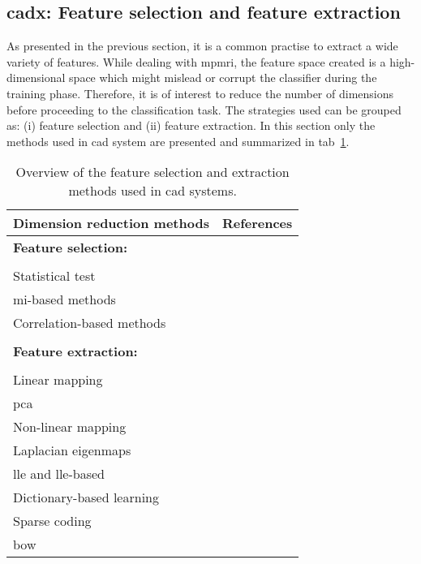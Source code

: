 \subsection{\acs*{cadx}: Feature selection and feature extraction} \label{subsec:chp3:img-clas:CADX-fea-ext}
As presented in the previous section, it is a common practise to extract a wide variety of features.
While dealing with \ac{mpmri}, the feature space created is a high-dimensional space which might mislead or corrupt the classifier during the training phase.
Therefore, it is of interest to reduce the number of dimensions before proceeding to the classification task.
The strategies used can be grouped as: (i) feature selection and (ii) feature extraction.
In this section only the methods used in \ac{cad} system are presented and summarized in \acs{tab}~\ref{tab:featext}.

\begin{table}
  \caption{Overview of the feature selection and extraction methods used in \acs*{cad} systems.}
  \scriptsize
  \centering
  \begin{tabular}{l r}
    \toprule
    \textbf{Dimension reduction methods} & \textbf{References} \\
    \midrule
    \textbf{Feature selection:} & \\ \\ [-1.5ex]
    \quad Statistical test & \cite{Niaf2011,Niaf2012,Vos2012} \\
    \quad \ac{mi}-based methods & \cite{Niaf2011,Niaf2012,Vos2008,lehaire2014computer,khalvati2015automated,chung2015prostate} \\
    \quad Correlation-based methods & \cite{rampun2016computer,rampun2015computer} \\ \\ [-1.5ex]
    \textbf{Feature extraction:} & \\ \\ [-1.5ex]
    \quad Linear mapping & \\
    \quad \quad \acs*{pca} & \cite{Tiwari2008,Tiwari2009} \\
    \quad Non-linear mapping & \\
    \quad \quad Laplacian eigenmaps & \cite{Tiwari2007,Tiwari2009a,Tiwari2009,Tiwari2010,Viswanath2008,Viswanath2011} \\
    \quad \quad \acs*{lle} and \acs*{lle}-based & \cite{Tiwari2008,Tiwari2009,Viswanath2008a,Viswanath2008} \\
    \quad Dictionary-based learning & \\
    \quad \quad Sparse coding & \cite{lehaire2014computer} \\
    \quad \quad \acs*{bow} & \cite{rampun2016computerb,rampun2015classifying} \\
    \bottomrule
  \end{tabular}
\label{tab:featext}
\end{table} 

